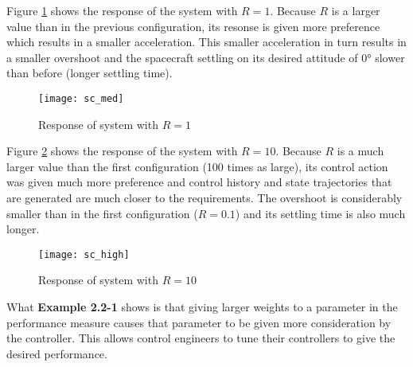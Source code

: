 Figure \ref{fig:sc_med} shows the response of the system with $R = 1$. 
Because $R$ is a larger value than in the previous configuration, its resonse 
is given more preference which results in a smaller acceleration. This smaller
acceleration in turn results in a smaller overshoot and the spacecraft settling 
on its desired attitude of $\ang{0}$ slower than before (longer settling time). 

\begin{figure}[H]
    \texttt{[image: sc\_med]}
    \centering
    \caption{Response of system with $R = 1$ \cite{kirkdover}}
    \label{fig:sc_med}
\end{figure}

Figure \ref{fig:sc_high} shows the response of the system with $R = 10$. 
Because $R$ is a much larger value than the first configuration (100 times as
large), its control action was given much more preference and control history
and state trajectories that are generated are much closer to the requirements.
The overshoot is considerably smaller than in the first configuration 
($R = 0.1$) and its settling time is also much longer.

\begin{figure}[H]
    \texttt{[image: sc\_high]}
    \centering
    \caption{Response of system with $R = 10$ \cite{kirkdover}}
    \label{fig:sc_high}
\end{figure}

What \textbf{Example 2.2-1} shows is that giving larger weights to a parameter
in the performance measure causes that parameter to be given more 
consideration by the controller. This allows control engineers to tune their
controllers to give the desired performance.
